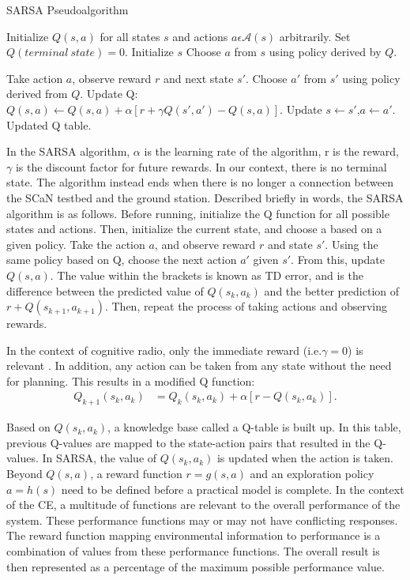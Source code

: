 	\begin{algorithm}[ht]
	\caption{SARSA Pseudoalgorithm}
	\label{code:bg_SARSA}
	\begin{algorithmic}[1]
		\State Initialize $Q(s,a)$ for all states $s$ and actions $a \epsilon \mathcal{A}(s)$ arbitrarily. Set $Q(terminal\ state)=0$.
		\State Initialize $s$
		\State Choose $a$ from $s$ using policy derived by $Q$.
		
		\State Take action $a$, observe reward $r$ and next state $s'$.
		\State Choose $a'$ from $s'$ using policy derived from $Q$.
		\State Update Q: $Q(s,a) \gets Q(s,a) + \alpha[r + \gamma Q(s',a')-Q(s,a)]$.
		\State Update $s \gets s'$,$a \gets a'$.
		\EndWhile
		\EndWhile
		\State \Return Updated Q table.
		\EndProcedure
	\end{algorithmic}
\end{algorithm}
\clearpage
		\par In the SARSA algorithm, $\alpha$ is the learning rate of the algorithm, r is the reward, $\gamma$ is the discount factor for future rewards. In our context, there is no terminal state. The algorithm instead ends when there is no longer a connection between the SCaN testbed and the ground station. Described briefly in words, the SARSA algorithm is as follows. Before running, initialize the Q function for all possible states and actions. Then, initialize the current state, and choose a based on a given policy. Take the action $a$, and observe reward $r$ and state $s'$. Using the same policy based on Q, choose the next action $a'$ given $s'$. From this, update $Q(s,a)$. The value within the brackets is known as TD error, and is the difference between the predicted value of $Q(s_k,a_k)$ and the better prediction of $r + Q(s_{k+1},a_{k+1})$. Then, repeat the process of taking actions and observing rewards. 
	\par In the context of cognitive radio, only the immediate reward (i.e.$\gamma = 0$) is relevant \cite{paulo_theory_paper}. In addition, any action can be taken from any state without the need for planning. This results in a modified Q function:
	\begin{align}
		Q_{k+1}(s_k,a_k) &= Q_k(s_k,a_k) + \alpha[r - Q(s_k,a_k)]. \label{eq:bg_sarsa2}
	\end{align}
	\par Based on $Q(s_k,a_k)$, a knowledge base called a Q-table is built up. In this table, previous Q-values are mapped to the state-action pairs that resulted in the Q-values. In SARSA, the value of $Q(s_k,a_k)$ is updated when the action is taken. Beyond $Q(s,a)$, a reward function $r = g(s,a)$ and an exploration policy $a = h(s)$ need to be defined before a practical model is complete. In the context of the CE, a multitude of functions are relevant to the overall performance of the system. These performance functions may or may not have conflicting responses. The reward function mapping environmental information to performance is a combination of values from these performance functions. The overall result is then represented as a percentage of the maximum possible performance value. 
